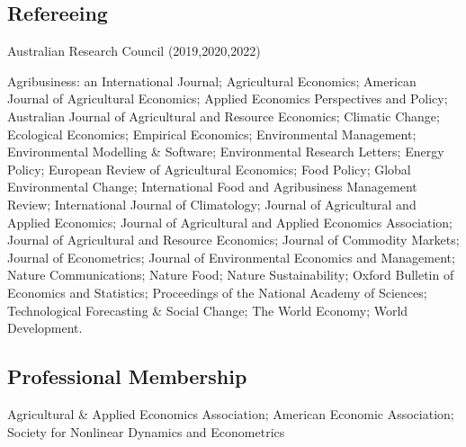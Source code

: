 \documentclass[10pt]{article}
\begin{document}
	\subsection*{Refereeing}
	Australian Research Council (2019,2020,2022)
	
	\medskip
	
	Agribusiness: an International Journal; Agricultural Economics; American Journal of Agricultural Economics; Applied Economics Perspectives and Policy; Australian Journal of Agricultural and Resource Economics; Climatic Change; Ecological Economics; Empirical Economics; Environmental Management; Environmental Modelling \& Software; Environmental Research Letters; Energy Policy; European Review of Agricultural Economics; Food Policy; Global Environmental Change; International Food and Agribusiness Management Review; International Journal of Climatology; Journal of Agricultural and Applied Economics; Journal of Agricultural and Applied Economics Association; Journal of Agricultural and Resource Economics; Journal of Commodity Markets; Journal of Econometrics; Journal of Environmental Economics and Management; Nature Communications; Nature Food; Nature Sustainability; Oxford Bulletin of Economics and Statistics; Proceedings of the National Academy of Sciences; Technological Forecasting \& Social Change; The World Economy; World Development.
	
	\subsection*{Professional Membership}
	Agricultural \& Applied Economics Association; 
	American Economic Association; 
	Society for Nonlinear Dynamics and Econometrics
	
	
\end{document}
